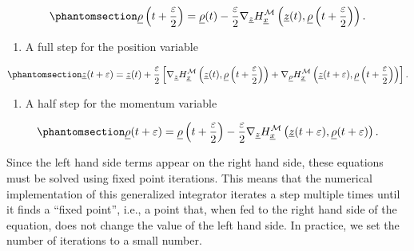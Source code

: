 \documentclass[
]{scrartcl}
\providecommand{\tightlist}{%
  \setlength{\itemsep}{0pt}\setlength{\parskip}{0pt}}
\begin{document}
\begin{refsection}
\begin{equation}\phantomsection\label{eq-generalized-leapfrog-momentum-half-step}{
\underline{\rho}\left(t+\frac{\varepsilon}{2}\right) = 
\underline{\rho}(t) - 
\frac{\varepsilon}{2} 
\nabla_{\underline{z}} H_{\underline{x}}^{\mathcal{M}}\left(
    \underline{z}(t), 
    \underline{\rho}\left(t+\frac{\varepsilon}{2}\right)
\right).
}\end{equation}

\begin{enumerate}
\def\labelenumi{\arabic{enumi}.}
\setcounter{enumi}{1}
\tightlist
\item
  A full step for the position variable
\end{enumerate}

\begin{equation}\phantomsection\label{eq-generalized-leapfrog-position-full-step}{
\underline{z}(t+\varepsilon) = 
\underline{z}(t) + 
\frac{\varepsilon}{2}
\left[
    \nabla_{\underline{z}} H_{\underline{x}}^{\mathcal{M}}\left(
        \underline{z}(t), 
        \underline{\rho}\left(t+\frac{\varepsilon}{2}\right)
    \right) +
    \nabla_{\underline{\rho}} H_{\underline{x}}^{\mathcal{M}}\left(
        \underline{z}(t+\varepsilon), 
        \underline{\rho}\left(t+\frac{\varepsilon}{2}\right)
    \right)
\right].
}\end{equation}

\begin{enumerate}
\def\labelenumi{\arabic{enumi}.}
\setcounter{enumi}{2}
\tightlist
\item
  A half step for the momentum variable
\end{enumerate}

\begin{equation}\phantomsection\label{eq-generalized-leapfrog-momentum-full-step}{
\underline{\rho}(t+\varepsilon) = 
\underline{\rho}\left(t+\frac{\varepsilon}{2}\right) - 
\frac{\varepsilon}{2} 
\nabla_{\underline{z}} H_{\underline{x}}^{\mathcal{M}}\left(
    \underline{z}(t+\varepsilon), 
    \underline{\rho}(t+\varepsilon)
\right).
}\end{equation}

Since the left hand side terms appear on the right hand side, these
equations must be solved using fixed point iterations. This means that
the numerical implementation of this generalized integrator iterates a
step multiple times until it finds a ``fixed point'', i.e., a point
that, when fed to the right hand side of the equation, does not change
the value of the left hand side. In practice, we set the number of
iterations to a small number.


\end{refsection}
\end{document}

